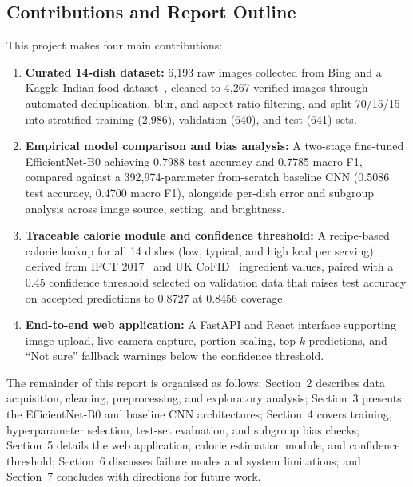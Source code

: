 \subsection{Contributions and Report Outline}
This project makes four main contributions:
\begin{enumerate}
  \item \textbf{Curated 14-dish dataset:} 6,193 raw images collected from Bing
        and a Kaggle Indian food dataset~\cite{jain_indian_food_kaggle}, cleaned
        to 4,267 verified images through automated deduplication, blur, and
        aspect-ratio filtering, and split 70/15/15 into stratified training
        (2,986), validation (640), and test (641) sets.
  \item \textbf{Empirical model comparison and bias analysis:} A two-stage
        fine-tuned EfficientNet-B0 achieving 0.7988 test accuracy and 0.7785
        macro F1, compared against a 392,974-parameter from-scratch baseline
        CNN (0.5086 test accuracy, 0.4700 macro F1), alongside per-dish error
        and subgroup analysis across image source, setting, and brightness.
  \item \textbf{Traceable calorie module and confidence threshold:} A
        recipe-based calorie lookup for all 14 dishes (low, typical, and high
        kcal per serving) derived from IFCT 2017~\cite{longvah2017ifct} and UK
        CoFID~\cite{cofid2021} ingredient values, paired with a 0.45 confidence
        threshold selected on validation data that raises test accuracy on
        accepted predictions to 0.8727 at 0.8456 coverage.
  \item \textbf{End-to-end web application:} A FastAPI and React interface
        supporting image upload, live camera capture, portion scaling, top-$k$
        predictions, and ``Not sure'' fallback warnings below the confidence
        threshold.
\end{enumerate}

The remainder of this report is organised as follows: Section~2 describes data
acquisition, cleaning, preprocessing, and exploratory analysis; Section~3
presents the EfficientNet-B0 and baseline CNN architectures; Section~4 covers
training, hyperparameter selection, test-set evaluation, and subgroup bias
checks; Section~5 details the web application, calorie estimation module, and
confidence threshold; Section~6 discusses failure modes and system limitations;
and Section~7 concludes with directions for future work.
